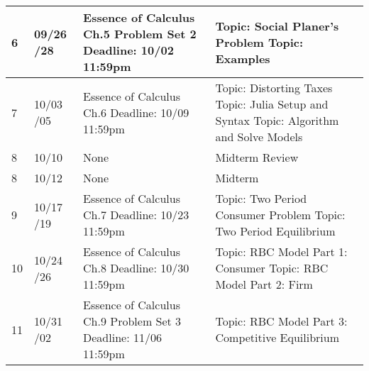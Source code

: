 \documentclass[12pt]{article}
\begin{document}
\begin{tabular}{|p{\bb}|p{\qq}|p{\rr}|p{\pp}|}
    \\
    \hline
        6
        &
        09/26
        \newline
        09/28
        &
        Essence of Calculus Ch.5
        \newline
        Problem Set 2
        \newline
        Deadline: 10/02 11:59pm
        &
        Topic: Social Planer's Problem
        \newline
        Topic: Examples
    \\
    \hline
        7
        &
        10/03
        \newline
        10/05
        &
        Essence of Calculus Ch.6
        \newline
        Deadline: 10/09 11:59pm
        &
        Topic: Distorting Taxes
        \newline
        Topic: Julia Setup and Syntax
        \newline
        Topic: Algorithm and Solve Models
    \\
    \hline
        8
        &
        10/10
        &
        None
        &
        Midterm Review
    \\
    \hline
        8
        &
        10/12
        &
        None
        &
        Midterm
    \\
    \hline
        9
        &
        10/17
        \newline
        10/19
        &
        Essence of Calculus Ch.7
        \newline
        Deadline: 10/23 11:59pm
        &
        Topic: Two Period Consumer Problem
        \newline
        Topic: Two Period Equilibrium
    \\
    \hline
        10
        &
        10/24
        \newline
        10/26
        &
        Essence of Calculus Ch.8
        \newline
        Deadline: 10/30 11:59pm
        &
        Topic: RBC Model Part 1: Consumer
        \newline
        Topic: RBC Model Part 2: Firm
    \\
    \hline
        11
        &
        10/31
        \newline
        11/02
        &
        Essence of Calculus Ch.9
        \newline
        Problem Set 3
        \newline
        Deadline: 11/06 11:59pm
        &
        Topic: RBC Model Part 3: Competitive Equilibrium

\end{tabular}
\end{document}
